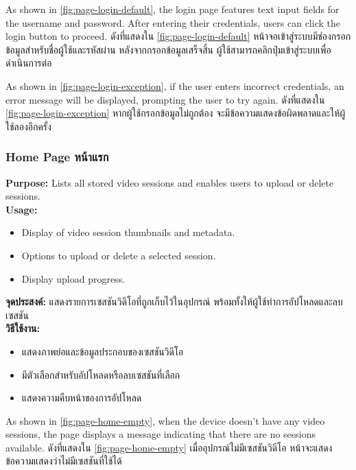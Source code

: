 \pageLoginDefault

\ifenglish
    As shown in \ref{fig:page-login-default}, the login page features text input fields for the username and password. After entering their credentials, users can click the login button to proceed.
\else
    ดังที่แสดงใน \ref{fig:page-login-default} หน้าจอเข้าสู่ระบบมีช่องกรอกข้อมูลสำหรับชื่อผู้ใช้และรหัสผ่าน หลังจากกรอกข้อมูลเสร็จสิ้น ผู้ใช้สามารถคลิกปุ่มเข้าสู่ระบบเพื่อดำเนินการต่อ
\fi

\pageLoginException

\ifenglish
    As shown in \ref{fig:page-login-exception}, if the user enters incorrect credentials, an error message will be displayed, prompting the user to try again.
\else
    ดังที่แสดงใน \ref{fig:page-login-exception} หากผู้ใช้กรอกข้อมูลไม่ถูกต้อง จะมีข้อความแสดงข้อผิดพลาดและให้ผู้ใช้ลองอีกครั้ง
\fi

\subsubsection{\ifenglish Home Page \else หน้าแรก \fi}
\ifenglish
\textbf{Purpose:} Lists all stored video sessions and enables users to upload or delete sessions.\\
\textbf{Usage:}
\begin{itemize}
    \item Display of video session thumbnails and metadata.
    \item Options to upload or delete a selected session.
    \item Display upload progress.
\end{itemize}
\else
\textbf{จุดประสงค์:} แสดงรายการเซสชันวิดีโอที่ถูกเก็บไว้ในอุปกรณ์ พร้อมทั้งให้ผู้ใช้ทำการอัปโหลดและลบเซสชัน\\
\textbf{วิธีใช้งาน:}
\begin{itemize}
    \item แสดงภาพย่อและข้อมูลประกอบของเซสชันวิดีโอ
    \item มีตัวเลือกสำหรับอัปโหลดหรือลบเซสชันที่เลือก
    \item แสดงความคืบหน้าของการอัปโหลด
\end{itemize}
\fi

\pageHomeEmpty

\ifenglish
    As shown in \ref{fig:page-home-empty}, when the device doesn't have any video sessions, the page displays a message indicating that there are no sessions available.
\else
    ดังที่แสดงใน \ref{fig:page-home-empty} เมื่ออุปกรณ์ไม่มีเซสชันวิดีโอ หน้าจะแสดงข้อความแสดงว่าไม่มีเซสชันที่ใช้ได้
\fi 


